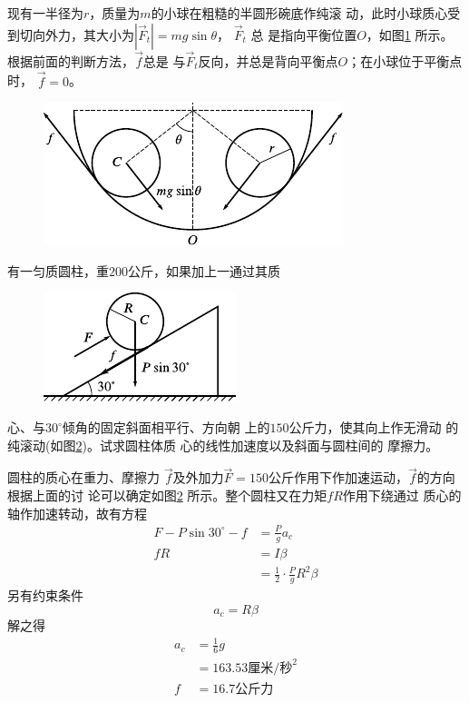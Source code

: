 现有一半径为$ r $，质量为$ m $的小球在粗糙的半圆形碗底作纯滚
动，此时小球质心受到切向外力，其大小为$  | \vec{F} _ t | = m g \sin \theta  $， $ \vec{F} _ t $ 总
是指向平衡位置$ O $，如图\ref{fig:10.16} 所示。根据前面的判断方法，$\vec{f}$总是
与$ \vec{F} _ t $反向，并总是背向平衡点$ O $；在小球位于平衡点时， $ \vec{f} = 0 $。

\begin{figure}[h]
    \centering
    \includegraphics{figure/fig10.16}
    \caption{}
    \label{fig:10.16}
\end{figure}

\clearpage
\example 有一匀质圆柱，重$ 200 $公斤，如果加上一通过其质
\begin{figure}
    \centering
    \includegraphics{figure/fig10.17}
    \caption{}
    \label{fig:10.17}
\end{figure}
心、与$ 30^\circ $倾角的固定斜面相平行、方向朝
上的$ 150 $公斤力，使其向上作无滑动
的纯滚动(如图\ref{fig:10.17})。试求圆柱体质
心的线性加速度以及斜面与圆柱间的
摩擦力。

\solution 圆柱的质心在重力、摩擦力
$\vec{f}$及外加力$ \vec{F}=150 $公斤作用下作加速运动，$\vec{f}$的方向根据上面的讨
论可以确定如图\ref{fig:10.17} 所示。整个圆柱又在力矩$ fR $作用下绕通过
质心的轴作加速转动，故有方程
\begin{equation*}
    \begin{split}
        F - P \sin 3 0 ^ { \circ } - f &= \frac { P } { g } a _ { c } \\
        f R &= I \beta \\
            &= \frac { 1 } { 2 } \cdot \frac { P } { g } R ^ { 2 } \beta
    \end{split}
\end{equation*}
另有约束条件
\begin{equation*}
    a _ { c } = R \beta
\end{equation*}
解之得
\begin{equation*}
    \begin{split}
        a _ { c } &= \frac { 1 } { 6 } g \\
                  &= 1 6 3 . 5  3 \text{厘米/秒} ^ 2 \\
                f &= 1 6 . 7  \text{公斤力}
    \end{split}
\end{equation*}


